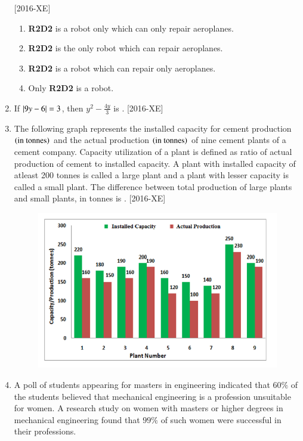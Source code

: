 \documentclass[journal]{IEEEtran}
\begin{document}
\begin{enumerate}
    \hfill{[2016-XE]}
\begin{enumerate}
    \item \textbf{R2D2} is a robot only which can only repair aeroplanes.
    \item \textbf{R2D2} is the only robot which can repair aeroplanes.
    \item \textbf{R2D2} is a robot which can  repair only aeroplanes.
    \item Only \textbf{R2D2} is a robot.
\end{enumerate}
\item If $\left\vert9y-6\right\vert=3$, then $y^2-\frac{4y}{3}$ is \underline{\hspace{1cm}}. \hfill{[2016-XE]}
\begin{enumerate}
\end{enumerate}
\item The following graph represents the installed capacity for cement production $\left(\text{in tonnes}\right)$ and the actual production $\left(\text{in tonnes}\right)$ of nine cement plants of a cement company. Capacity utilization of a plant is defined as ratio of actual production of cement to installed capacity. A plant with installed capacity of atleast 200 tonnes is called a large plant and a plant with lesser capacity is called a small plant. The difference between total production of large plants and small plants, in tonnes is \underline{\hspace{1cm}}. \hfill{[2016-XE]}
\begin{figure}[H]
    \centering
    \includegraphics[width=0.5\linewidth]{figs/Figure_1.png}
    \label{fig:enter-label}
\end{figure}

\item A poll of students appearing for masters in engineering indicated that $60\%$ of the students believed that mechanical engineering is a profession unsuitable for women. A research study on women with masters or higher degrees in mechanical engineering found that $99 \%$ of such women were successful in their professions.\\


\end{enumerate}
\end{document}
